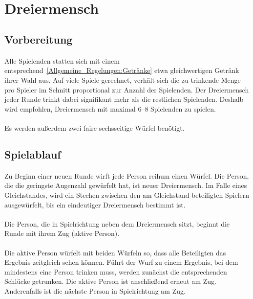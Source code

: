 \section{Dreiermensch}

\subsection{Vorbereitung}
\paragraph{}
Alle Spielenden statten sich mit einem entsprechend~\ref{Allgemeine_Regelungen:Getränke} etwa gleichwertigen Getränk ihrer Wahl aus.
Auf viele Spiele gerechnet, verhält sich die zu trinkende Menge pro Spieler im Schnitt proportional zur Anzahl der Spielenden.
Der Dreiermensch jeder Runde trinkt dabei signifikant mehr als die restlichen Spielenden.
Deshalb wird empfohlen, Dreiermensch mit maximal 6--8 Spielenden zu spielen.

\paragraph{}
Es werden außerdem zwei faire sechsseitige Würfel benötigt.

\subsection{Spielablauf}
\paragraph{}\label{Dreiermensch:Spielablauf:NeueRunde}
Zu Beginn einer neuen Runde wirft jede Person reihum einen Würfel.
Die Person, die die geringste Augenzahl gewürfelt hat, ist neuer Dreiermensch.
Im Falle eines Gleichstandes, wird ein Stechen zwischen den am Gleichstand beteiligten Spielern ausgewürfelt, bis ein eindeutiger Dreiermensch bestimmt ist.

\paragraph{}
Die Person, die in Spielrichtung neben dem Dreiermensch sitzt, beginnt die Runde mit ihrem Zug (\glqq{}aktive Person\grqq{}).

\paragraph{}
Die aktive Person würfelt mit beiden Würfeln so, dass alle Beteiligten das Ergebnis zeitgleich sehen können.
Führt der Wurf zu einem Ergebnis, bei dem mindestens eine Person trinken muss, werden zunächst die entsprechenden Schlücke getrunken.
Die aktive Person ist anschließend erneut am Zug.
Anderenfalls ist die nächste Person in Spielrichtung am Zug.


